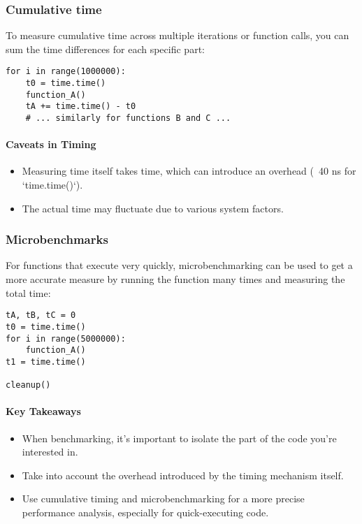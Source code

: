 \documentclass[12pt]{article}
\begin{document}
\subsubsection{Cumulative time}
To measure cumulative time across multiple iterations or function calls, you can sum the time differences for each specific part:

\begin{verbatim}
for i in range(1000000):
    t0 = time.time()
    function_A()
    tA += time.time() - t0
    # ... similarly for functions B and C ...
\end{verbatim}

\paragraph{Caveats in Timing}
\begin{itemize}
    \item Measuring time itself takes time, which can introduce an overhead (~40 ns for `time.time()`).
    \item The actual time may fluctuate due to various system factors.
\end{itemize}

\subsubsection{Microbenchmarks}

For functions that execute very quickly, microbenchmarking can be used to get a more accurate measure by running the function many times and measuring the total time:

\begin{verbatim}
tA, tB, tC = 0
t0 = time.time()
for i in range(5000000):
    function_A()
t1 = time.time()

cleanup()
\end{verbatim}

\paragraph{Key Takeaways}
\begin{itemize}
    \item When benchmarking, it's important to isolate the part of the code you're interested in.
    \item Take into account the overhead introduced by the timing mechanism itself.
    \item Use cumulative timing and microbenchmarking for a more precise performance analysis, especially for quick-executing code.
\end{itemize}
\end{document}
